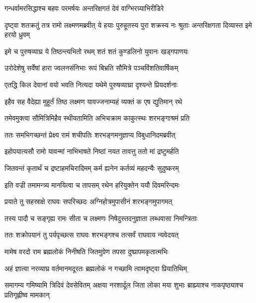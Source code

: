 \twolineshloka
{गन्धर्वामरसिद्धाश्च बहवः परमर्षयः}
{अन्तरिक्षगतं देवं वाग्भिरग्र्याभिरीडिरे} %

\threelineshloka
{दृष्ट्वा शतक्रतुं तत्र रामो लक्ष्मणमब्रवीत्}
{ये हयाः पुरुहूतस्य पुरा शक्रस्य नः श्रुताः}
{अन्तरिक्षगता दिव्यास्त इमे हरयो ध्रुवम्} %

\twolineshloka
{इमे च पुरुषव्याघ्र ये तिष्ठन्त्यभितो रथम्}
{शतं शतं कुण्डलिनो युवानः खड्गपाणयः} %

\twolineshloka
{उरोदेशेषु सर्वेषां हारा ज्वलनसंनिभाः}
{रूपं बिभ्रति सौमित्रे पञ्चविंशतिवार्षिकम्} %

\twolineshloka
{एतद्धि किल देवानां वयो भवति नित्यदा}
{यथेमे पुरुषव्याघ्रा दृश्यन्ते प्रियदर्शनाः} %

\twolineshloka
{इहैव सह वैदेह्या मुहूर्तं तिष्ठ लक्ष्मण}
{यावज्जनाम्यहं व्यक्तं क एष द्युतिमान् रथे} %

\twolineshloka
{तमेवमुक्त्वा सौमित्रिमिहैव स्थीयतामिति}
{अभिचक्राम काकुत्स्थः शरभङ्गाश्रमं प्रति} %

\twolineshloka
{ततः समभिगच्छन्तं प्रेक्ष्य रामं शचीपतिः}
{शरभङ्गमनुज्ञाप्य विबुधानिदमब्रवीत्} %

\twolineshloka
{इहोपयात्यसौ रामो यावन्मां नाभिभाषते}
{निष्ठां नयत तावत्तु ततो मां द्रष्टुमर्हति} %

\twolineshloka
{जितवन्तं कृतार्थं च द्रष्टाहमचिरादिमम्}
{कर्म ह्यनेन कर्तव्यं महदन्यैः सुदुष्करम्} %

\twolineshloka
{इति वज्री तमामन्त्र्य मानयित्वा च तापसम्}
{रथेन हरियुक्तेन ययौ दिवमरिन्दमः} %

\twolineshloka
{प्रयाते तु सहस्राक्षे राघवः सपरिच्छदः}
{अग्निहोत्रमुपासीनं शरभङ्गमुपागमत्} %

\twolineshloka
{तस्य पादौ च सङ्गृह्य रामः सीता च लक्ष्मणः}
{निषेदुस्तदनुज्ञाता लब्धवासा निमन्त्रिताः} %

\twolineshloka
{ततः शक्रोपयानं तु पर्यपृच्छत्स राघवः}
{शरभङ्गश्च तत्सर्वं राघवाय न्यवेदयत्} %

\twolineshloka
{मामेष वरदो राम ब्रह्मलोकं निनीषति}
{जितमुग्रेण तपसा दुष्प्रापमकृतात्मभिः} %

\twolineshloka
{अहं ज्ञात्वा नरव्याघ्र वर्तमानमदूरतः}
{ब्रह्मलोकं न गच्छामि त्वामदृष्ट्वा प्रियातिथिम्} %

\threelineshloka
{समागम्य गमिष्यामि त्रिदिवं देवसेवितम्}
{अक्षया नरशार्दूल जिता लोका मया शुभाः}
{ब्राह्म्याश्च नाकपृष्ठ्याश्च प्रतिगृह्णीष्व मामकान्} %

